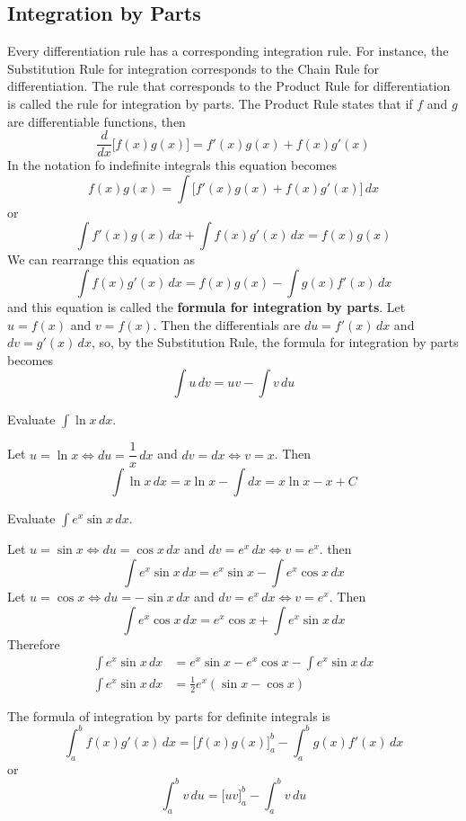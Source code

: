\subsection{Integration by Parts}

Every differentiation rule has a corresponding integration rule.
For instance, the Substitution Rule for integration corresponds to the Chain
Rule for differentiation.
The rule that corresponds to the Product Rule for differentiation is called
the rule for integration by parts.
The Product Rule states that if \(f\) and \(g\) are differentiable functions,
then
\[\frac{d}{dx}\big[f(x)g(x)\big]=f'(x)g(x)+f(x)g'(x)\]
In the notation fo indefinite integrals this equation becomes
\[f(x)g(x)=\int\big[f'(x)g(x)+f(x)g'(x)\big]\,dx\]
or
\[\int f'(x)g(x)\,dx+\int f(x)g'(x)\,dx=f(x)g(x)\]
We can rearrange this equation as
\[\int f(x)g'(x)\,dx=f(x)g(x)-\int g(x)f'(x)\,dx\]
and this equation is called the \textbf{formula for integration by parts}.
Let \(u=f(x)\) and \(v=f(x)\).
Then the differentials are \(du=f'(x)\,dx\) and \(dv=g'(x)\,dx\), so, by the
Substitution Rule, the formula for integration by parts becomes
\[\int u\,dv=uv-\int v\,du\]

\begin{problem}
    Evaluate \(\displaystyle{\int\ln x\,dx}\).
\end{problem}
\begin{solution}
    Let \(u=\ln x\iff du=\dfrac{1}{x}\,dx\) and \(dv=dx\iff v=x\).
    Then
    \[\int\ln x\,dx=x\ln x-\int dx=x\ln x-x+C\]
\end{solution}
\begin{problem}
    Evaluate \(\displaystyle{\int e^x\sin x\,dx}\).
\end{problem}
\begin{solution}
    Let \(u=\sin x\iff du=\cos x\,dx\) and \(dv=e^x\,dx\iff v=e^x\).
    then
    \[\int e^x\sin x\,dx=e^x\sin x-\int e^x\cos x\,dx\]
    Let \(u=\cos x\iff du=-\sin x\,dx\) and \(dv=e^x\,dx\iff v=e^x\).
    Then
    \[\int e^x\cos x\,dx=e^x\cos x+\int e^x\sin x\,dx\]
    Therefore
    \begin{align*}
        \int e^x\sin x\,dx &= e^x\sin x-e^x\cos x-\int e^x\sin x\,dx \\
        \int e^x\sin x\,dx &= \frac{1}{2}e^x(\sin x-\cos x) 
    \end{align*}
\end{solution}
The formula of integration by parts for definite integrals is
\[\int_a^b f(x)g'(x)\,dx=\big[f(x)g(x)\big]_a^b-\int_a^b g(x)f'(x)\,dx\]
or
\[\int_a^b v\,du=\big[uv\big]_a^b-\int_a^b v\,du\]

